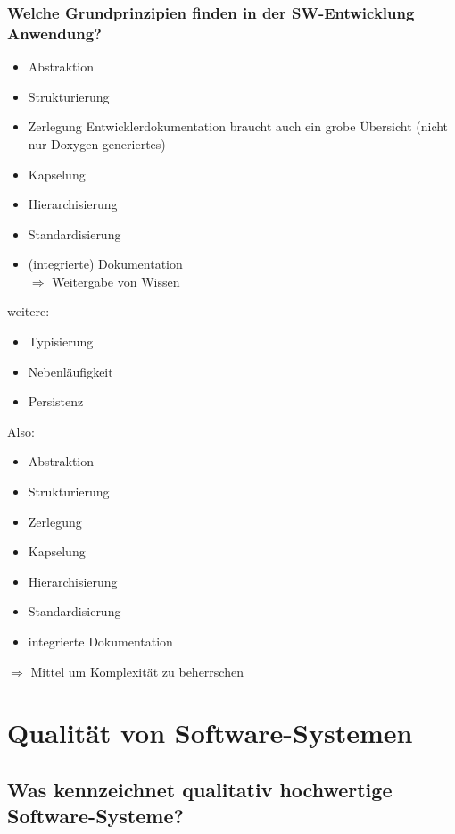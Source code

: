 \documentclass{scrreprt}
\begin{document}
\subsection{Welche Grundprinzipien finden in der SW-Entwicklung Anwendung?}
\begin{itemize}
\item Abstraktion
\item Strukturierung
\item Zerlegung
Entwicklerdokumentation braucht auch ein grobe Übersicht (nicht nur Doxygen generiertes)
\item Kapselung
\item Hierarchisierung
\item Standardisierung
\item (integrierte) Dokumentation\\
$\Rightarrow$ Weitergabe von Wissen
\end{itemize}
weitere:
\begin{itemize}
\item Typisierung
\item Nebenläufigkeit
\item Persistenz
\end{itemize}
Also: 
\begin{itemize}
\item Abstraktion 
\item Strukturierung
\item Zerlegung
\item Kapselung
\item Hierarchisierung
\item Standardisierung
\item integrierte Dokumentation
\end{itemize}
$\Rightarrow$ Mittel um Komplexität zu beherrschen

\chapter{Qualität von Software-Systemen}
\section{Was kennzeichnet qualitativ hochwertige Software-Systeme?}
\end{document}
